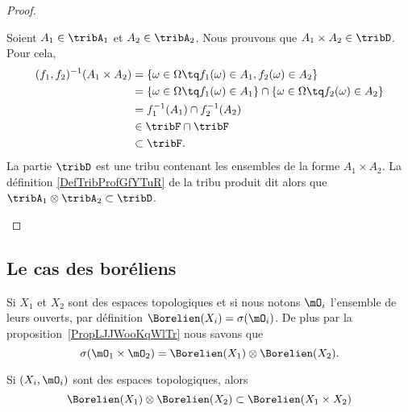 \begin{proof}
\begin{subproof}
		Soient \( A_1\in\tribA_1\) et \( A_2\in\tribA_2\). Nous prouvons que \( A_1\times A_2\in\tribD\). Pour cela,
		\begin{subequations}
			\begin{align}
				(f_1,f_2)^{-1}(A_1\times A_2) & =\{ \omega\in \Omega\tq f_1(\omega)\in A_1,f_2(\omega)\in A_2 \}                             \\
				                              & =\{ \omega\in\Omega\tq f_1(\omega)\in A_1 \}\cap\{ \omega\in \Omega\tq f_2(\omega)\in A_2 \} \\
				                              & =f_1^{-1}(A_1)\cap f_2^{-1}(A_2)                                                             \\
				                              & \in \tribF\cap\tribF                                                                         \\
				                              & \subset\tribF.
			\end{align}
		\end{subequations}
		\spitem[Conclusion]
		La partie \( \tribD\) est une tribu contenant les ensembles de la forme \( A_1\times A_2\). La définition \ref{DefTribProfGfYTuR} de la tribu produit dit alors que \( \tribA_1\otimes \tribA_2\subset \tribD\).
	\end{subproof}
\end{proof}


\subsection{Le cas des boréliens}

Si \( X_1\) et  \( X_2\) sont des espaces topologiques et si nous notons \( \mO_i\) l'ensemble de leurs ouverts, par définition \( \Borelien(X_i)=\sigma(\mO_i)\). De plus par la proposition~\ref{PropLJJWooKqWlTr} nous savons que
\begin{equation}        \label{EqOHMSooRSLrDk}
	\sigma(\mO_1\times \mO_2)=\Borelien(X_1)\otimes \Borelien(X_2).
\end{equation}

\begin{lemma}       \label{LemDEDQooJyzXgC}
	Si \( (X_i,\mO_i)\) sont des espaces topologiques, alors
	\begin{equation}
		\Borelien(X_1)\otimes \Borelien(X_2)\subset \Borelien(X_1\times X_2)
	\end{equation}
\end{lemma}

